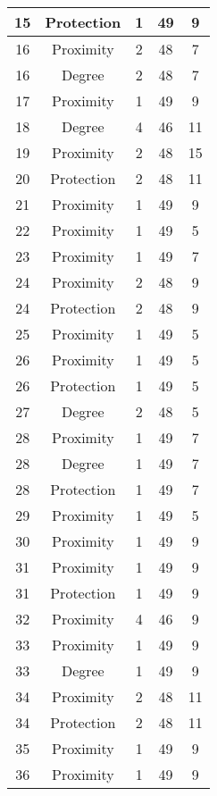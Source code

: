 \documentclass[results.tex]{subfiles}
\begin{document}
\begin{center}
\begin{tabular}{| c || c | c | c | c |}
    \hline
    15 & Protection & 1 & 49 & 9 \\ 
    \hline
    16 & Proximity & 2 & 48 & 7 \\ 
    \hline
    16 & Degree & 2 & 48 & 7 \\ 
    \hline
    17 & Proximity & 1 & 49 & 9 \\ 
    \hline
    18 & Degree & 4 & 46 & 11 \\ 
    \hline
    19 & Proximity & 2 & 48 & 15 \\ 
    \hline
    20 & Protection & 2 & 48 & 11 \\ 
    \hline
    21 & Proximity & 1 & 49 & 9 \\ 
    \hline
    22 & Proximity & 1 & 49 & 5 \\ 
    \hline
    23 & Proximity & 1 & 49 & 7 \\ 
    \hline
    24 & Proximity & 2 & 48 & 9 \\ 
    \hline
    24 & Protection & 2 & 48 & 9 \\ 
    \hline
    25 & Proximity & 1 & 49 & 5 \\ 
    \hline
    26 & Proximity & 1 & 49 & 5 \\ 
    \hline
    26 & Protection & 1 & 49 & 5 \\ 
    \hline
    27 & Degree & 2 & 48 & 5 \\ 
    \hline
    28 & Proximity & 1 & 49 & 7 \\ 
    \hline
    28 & Degree & 1 & 49 & 7 \\ 
    \hline
    28 & Protection & 1 & 49 & 7 \\ 
    \hline
    29 & Proximity & 1 & 49 & 5 \\ 
    \hline
    30 & Proximity & 1 & 49 & 9 \\ 
    \hline
    31 & Proximity & 1 & 49 & 9 \\ 
    \hline
    31 & Protection & 1 & 49 & 9 \\ 
    \hline
    32 & Proximity & 4 & 46 & 9 \\ 
    \hline
    33 & Proximity & 1 & 49 & 9 \\ 
    \hline
    33 & Degree & 1 & 49 & 9 \\ 
    \hline
    34 & Proximity & 2 & 48 & 11 \\ 
    \hline
    34 & Protection & 2 & 48 & 11 \\ 
    \hline
    35 & Proximity & 1 & 49 & 9 \\ 
    \hline
    36 & Proximity & 1 & 49 & 9 \\ 

\end{tabular}
\end{center}
\end{document}
